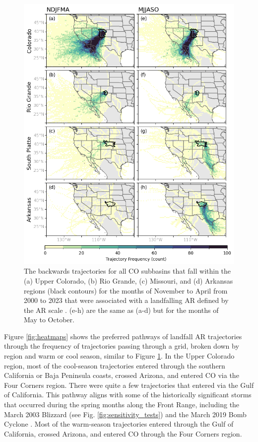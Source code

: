 \documentclass[draft]{agujournal2019}
\begin{document}
\begin{figure}
\noindent\includegraphics[width=\textwidth, height=\textheight, keepaspectratio]{fig4.png}
\caption{The backwards trajectories for all CO subbasins that fall within the (a) Upper Colorado, (b) Rio Grande, (c) Missouri, and (d) Arkansas regions (black contours) for the months of November to April from 2000 to 2023 that were associated with a landfalling AR defined by the AR scale \cite{MartinRalph2019}. (e-h) are the same as (a-d) but for the months of May to October. }
\label{fig:spaghetti_plot}
\end{figure}


Figure \ref{fig:heatmaps} shows the preferred pathways of landfall AR trajectories through the frequency of trajectories passing through a grid, broken down by region and warm or cool season, similar to Figure \ref{fig:spaghetti_plot}. In the Upper Colorado region, most of the cool-season trajectories entered through the southern California or Baja Peninsula coasts, crossed Arizona, and entered CO via the Four Corners region. There were quite a few trajectories that entered via the Gulf of California. This pathway aligns with some of the historically significant storms that occurred during the spring months along the Front Range, including the March 2003 Blizzard (see Fig. \ref{fig:sensitivity_tests}) and the March 2019 Bomb Cyclone \cite{Zou2024A2019}. Most of the warm-season trajectories entered through the Gulf of California, crossed Arizona, and entered CO through the Four Corners region. 
\end{document}
